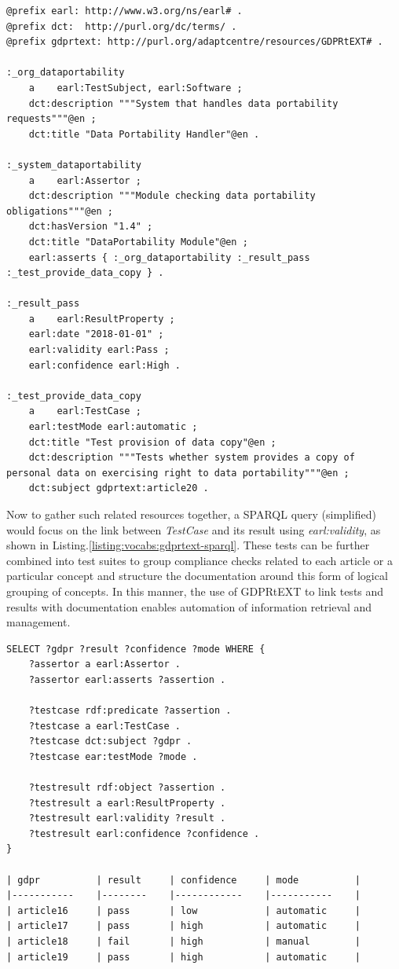 \begin{lstlisting}[label={listing:vocab:gdprtext-earl},caption={Use of GDPRtEXT to link tests with GDPR Articles in EARL report}]
@prefix earl: http://www.w3.org/ns/earl# .
@prefix dct:  http://purl.org/dc/terms/ .
@prefix gdprtext: http://purl.org/adaptcentre/resources/GDPRtEXT# .

:_org_dataportability
    a    earl:TestSubject, earl:Software ;
    dct:description """System that handles data portability requests"""@en ;
    dct:title "Data Portability Handler"@en .

:_system_dataportability
    a    earl:Assertor ;
    dct:description """Module checking data portability obligations"""@en ;
    dct:hasVersion "1.4" ;
    dct:title "DataPortability Module"@en ;
    earl:asserts { :_org_dataportability :_result_pass :_test_provide_data_copy } .

:_result_pass
    a    earl:ResultProperty ;
    earl:date "2018-01-01" ;
    earl:validity earl:Pass ;
    earl:confidence earl:High .

:_test_provide_data_copy
    a    earl:TestCase ;
    earl:testMode earl:automatic ;
    dct:title "Test provision of data copy"@en ;
    dct:description """Tests whether system provides a copy of personal data on exercising right to data portability"""@en ;
    dct:subject gdprtext:article20 .
\end{lstlisting}

Now to gather such related resources together, a SPARQL query (simplified) would focus on the link between \textit{TestCase} and its result using \textit{earl:validity}, as shown in Listing.\ref{listing:vocabs:gdprtext-sparql}.
These tests can be further combined into test suites to group compliance checks related to each article or a particular concept and structure the documentation around this form of logical grouping of concepts.
In this manner, the use of GDPRtEXT to link tests and results with documentation enables automation of information retrieval and management.

\begin{lstlisting}[label={listing:vocabs:gdprtext-sparql},caption={SPARQL query and results showing retrieved GDPR test results by article}]
SELECT ?gdpr ?result ?confidence ?mode WHERE {
    ?assertor a earl:Assertor .
    ?assertor earl:asserts ?assertion .

    ?testcase rdf:predicate ?assertion .
    ?testcase a earl:TestCase .
    ?testcase dct:subject ?gdpr .
    ?testcase ear:testMode ?mode .

    ?testresult rdf:object ?assertion .
    ?testresult a earl:ResultProperty .
    ?testresult earl:validity ?result .
    ?testresult earl:confidence ?confidence .
}

| gdpr          | result     | confidence     | mode          |
|-----------    |--------    |------------    |-----------    |
| article16     | pass       | low            | automatic     |
| article17     | pass       | high           | automatic     |
| article18     | fail       | high           | manual        |
| article19     | pass       | high           | automatic     |
\end{lstlisting}

